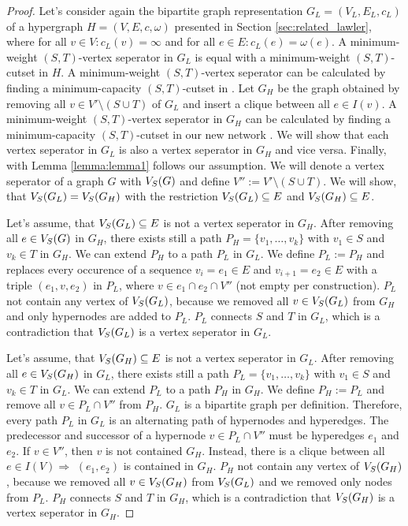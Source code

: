 \begin{proof}

Let's consider again the bipartite graph representation $G_L = (V_L,E_L,c_L)$ 
of a hypergraph $H = (V,E,c,\omega)$ presented in Section \ref{sec:related_lawler}, 
where for all $v \in V: c_L(v) = \infty$ and for all $e \in E: c_L(e) = 
\omega(e)$. A minimum-weight $(S,T)$-vertex seperator in $G_L$ is equal
with a minimum-weight $(S,T)$-cutset in $H$. A minimum-weight $(S,T)$-vertex seperator can be calculated
by finding a minimum-capacity $(S,T)$-cutset in . Let $G_H$ be the graph obtained by removing
all $v \in V'\setminus (S \cup T)$ of $G_L$ and insert a clique between all $e \in I(v)$. 
A minimum-weight $(S,T)$-vertex seperator in $G_H$ can be calculated by finding a 
minimum-capacity $(S,T)$-cutset in our new network .
We will show that each vertex seperator in $G_L$ is also a vertex seperator in $G_H$ and
vice versa. Finally, with Lemma \ref{lemma:lemma1} follows our assumption. We will 
denote a vertex seperator of a graph $G$ with $V_S(G)$ and define $V'' := V' \setminus (S \cup T)$. 
We will show, that $V_S(G_L) = V_S(G_H)$ with the restriction $V_S(G_L) \subseteq E$ and
$V_S(G_H) \subseteq E$.

Let's assume, that $V_S(G_L) \subseteq E$ is not a vertex seperator in $G_H$. After removing all $e \in V_S(G)$ in
$G_H$, there exists still a path $P_H = \{v_1, \ldots, v_k\}$ with $v_1 \in S$ and
$v_k \in T$ in $G_H$. We can extend $P_H$ to a path $P_L$ in $G_L$.
We define $P_L := P_H$ and replaces every occurence of a sequence $v_i = e_1 \in E$ and
$v_{i+1} = e_2 \in E$ with a triple $(e_1,v,e_2)$ in $P_L$, where $v \in e_1 \cap e_2 \cap V''$
(not empty per construction). $P_L$ not contain any vertex of $V_S(G_L)$, because
we removed all $v \in V_S(G_L)$ from $G_H$ and only hypernodes are added to $P_L$. $P_L$ connects $S$ and 
$T$ in $G_L$, which is a contradiction that $V_S(G_L)$ is a vertex seperator in $G_L$.

Let's assume, that $V_S(G_H) \subseteq E$ is not a vertex seperator in $G_L$. After removing all $e \in V_S(G_H)$ in
$G_L$, there exists still a path $P_L = \{v_1, \ldots, v_k\}$ with $v_1 \in S$ and
$v_k \in T$ in $G_L$. We can extend $P_L$ to a path $P_H$ in $G_H$.
We define $P_H := P_L$ and remove all $v \in P_L \cap V''$ from $P_H$. $G_L$ is a bipartite
graph per definition. Therefore, every path $P_L$ in $G_L$ is an alternating path of hypernodes and
hyperedges. The predecessor and successor of a hypernode $v \in P_L \cap V''$ must be hyperedges
$e_1$ and $e_2$. If $v \in V''$, then $v$ is not contained $G_H$. Instead, there is
a clique between all $e \in I(V) \Rightarrow$ $(e_1,e_2)$ is contained in $G_H$.
$P_H$ not contain any vertex of $V_S(G_H)$, because we removed all $v \in V_S(G_H)$ from $V_S(G_L)$ 
and we removed only nodes from $P_L$. $P_H$ connects $S$ and $T$ in $G_H$, which is a contradiction 
that $V_S(G_H)$ is a vertex seperator in $G_H$.


\end{proof}
